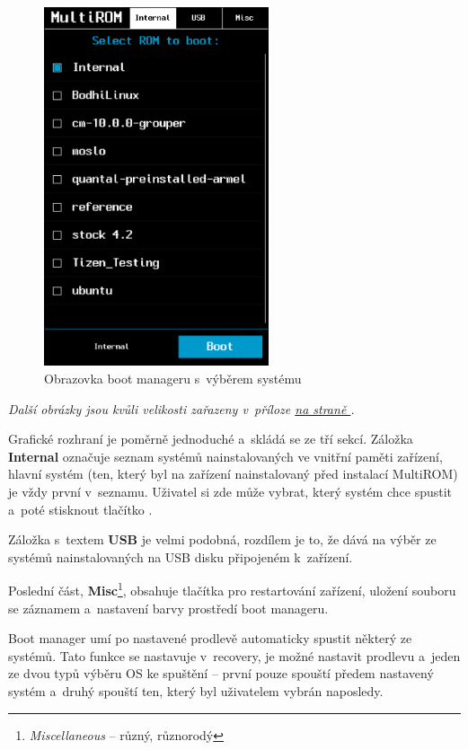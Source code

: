 \documentclass[12pt, a4paper, oneside]{article}
\newcommand{\B}{\textbf} %
\newcommand{\It}{\textit}  %
\newcommand*{\attref}[1]{\hyperref[{#1}]{\uv{\nameref*{#1}} na straně \pageref{#1}}}
\begin{document}
\begin{figure}[H]
\begin{center}
 \includegraphics[width=250px]{img/boot_manager.png}
\caption{Obrazovka boot manageru s~výběrem systému}
\end{center}
\end{figure}
\vspace{-20pt}
\noindent \It{Další obrázky jsou kvůli velikosti zařazeny v~příloze \attref{obrazky}.}

Grafické rozhraní je poměrně jednoduché a~skládá se ze tří sekcí. Záložka \B{Internal} označuje seznam systémů nainstalovaných ve vnitřní paměti zařízení, hlavní systém (ten, který byl na zařízení nainstalovaný před instalací MultiROM) je vždy první v~seznamu. Uživatel si zde může vybrat, který systém chce spustit a~poté stisknout tlačítko .

Záložka s~textem \B{USB} je velmi podobná, rozdílem je to, že dává na výběr ze systémů nainstalovaných na USB disku připojeném k~zařízení.

Poslední část, \B{Misc}\footnote{\It{Miscellaneous} -- různý, různorodý}, obsahuje tlačítka pro restartování zařízení, uložení souboru se záznamem a~nastavení barvy prostředí boot manageru.

Boot manager umí po nastavené prodlevě automaticky spustit některý ze systémů. Tato funkce se nastavuje v~recovery, je možné nastavit prodlevu a~jeden ze dvou typů výběru OS ke spuštění -- první pouze spouští předem nastavený systém a~druhý spouští ten, který byl uživatelem vybrán naposledy.
\end{document}
